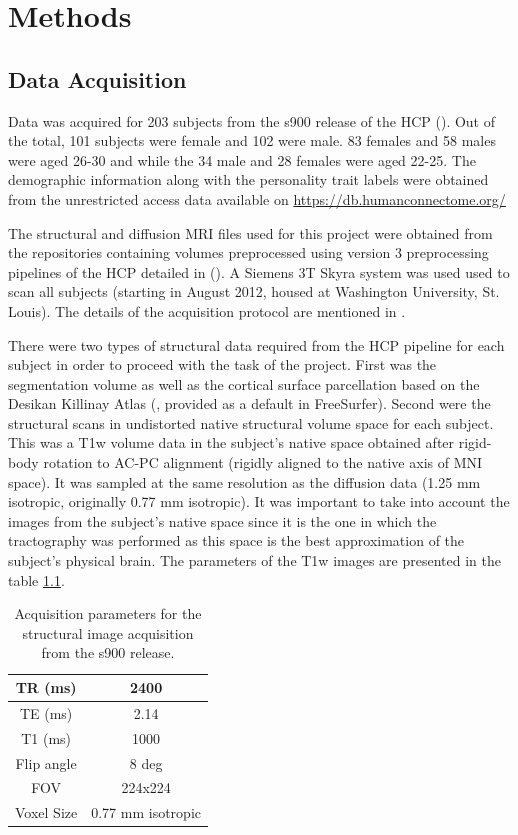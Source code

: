 \documentclass[msthesis.tex]{subfiles}
\begin{document}
\chapter{Methods}

\section{Data Acquisition}
\label{sec:acquisition}
Data was acquired for 203 subjects from the s900 release of the HCP (\cite{hcp2015wu}). Out of the total, 101 subjects were female and 102 were male. 83 females and 58 males were aged 26-30 and while the 34 male and 28 females were aged 22-25. The demographic information along with the personality trait labels were obtained from the unrestricted access data available on \href{https://db.humanconnectome.org/}{https://db.humanconnectome.org/}


The structural and diffusion MRI files used for this project were obtained from the repositories containing volumes preprocessed using version 3 preprocessing pipelines of the HCP detailed in (\cite{GLASSER2013105}). A Siemens 3T Skyra system was used used to scan all subjects (starting in August 2012, housed at Washington University, St. Louis). The details of the acquisition protocol are mentioned in \cite{van2012human}.


There were two types of structural data required from the HCP pipeline for each subject in order to proceed with the task of the project. First was the segmentation volume as well as the cortical surface parcellation based on the Desikan Killinay Atlas (\cite{desikan2006automated}, provided as a default in FreeSurfer). Second were the structural scans in undistorted native structural volume space for each subject. This was a T1w volume data in the subject's native space obtained after rigid-body rotation to AC-PC alignment (rigidly aligned to the native axis of MNI space). It was sampled at the same resolution as the diffusion data (1.25 mm isotropic, originally 0.77 mm isotropic). It was important to take into account the images from the subject's native space since it is the one in which the tractography was performed as this space is the best approximation of the subject's physical brain. The parameters of the T1w images are presented in the table \ref{tab:structuralmri}.
\begin{table}[]
    \centering
    \begin{tabular}{|c|c|}
    \hline
         TR (ms) & 2400  \\
    \hline
         TE (ms) & 2.14 \\
    \hline
         T1 (ms) & 1000 \\
    \hline
         Flip angle & 8 deg \\
    \hline
         FOV & 224x224 \\
    \hline
         Voxel Size & 0.77 mm isotropic \\
    \hline
    \end{tabular}
    \caption{Acquisition parameters for the structural image acquisition from the s900 release. }
    \label{tab:structuralmri}
\end{table}
\end{document}
